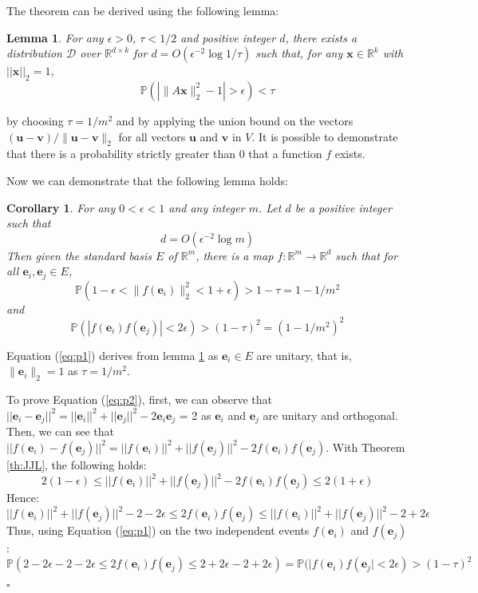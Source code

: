 \documentclass[twoside,11pt]{article}
\newtheorem{lemma}{Lemma}
\newtheorem{corollary}[theorem]{Corollary}
\newenvironment{proof}{{\bf Proof:}}{$\square$ }
\def\vec#1{\mathbf{#1}}
\def\R{\mathbb{R}}
\def\P{\mathbb{P}}
\begin{document}
The theorem can be derived using the following lemma:
\begin{lemma}
\label{th:lemma_1}
For any $\epsilon>0$, $\tau < 1/2$ and positive integer $d$, there exists a distribution $\mathcal D$ over $\R^{d\times k}$ for $d=O(\epsilon^{-2}\log{1/\tau})$ such that, for any $\vec{x} \in \R^k$ with $||\vec{x}||_2=1$,
$$\P(| \|A\vec{x}\|_2^2 -1  | > \epsilon) < \tau$$
\end{lemma}
by choosing $\tau = 1/m^2$ and by applying the union bound on the vectors $(\vec{u} - \vec{v})/\|\vec{u}-\vec{v}\|_2$ for all vectors $\vec{u}$ and $\vec{v}$ in $V$. It is possible to demonstrate that there is a probability strictly greater than $0$ that a function $f$ exists.

Now we can demonstrate that the following lemma holds:
\begin{corollary}
\label{existence_of_f}
For any $0 < \epsilon < 1$ and any integer $m$. Let $d$ be a positive integer such that
$$d=O(\epsilon^{-2}\log{m})$$
Then given the standard basis $E$ of ${\mathbb R}^m$, there is a map $f : {\mathbb R}^m \rightarrow {\mathbb R}^d$ such that for all $\vec{e}_i, \vec{e}_j \in E$, 
\begin{equation}
\P(1 - \epsilon<\|f(\vec{e}_i)\|_2^2 <1 + \epsilon) > 1 - \tau = 1 - 1/m^2
\label{eq:p1}
\end{equation}
and
\begin{equation}
\P(|f(\vec{e}_i)f(\vec{e}_j)|<2\epsilon)> (1 - \tau)^2 = (1 - 1/m^2)^2
\label{eq:p2}
\end{equation}
\end{corollary}

\begin{proof}
Equation (\ref{eq:p1}) derives from lemma \ref{th:lemma_1} as $\vec{e}_i \in E$ are unitary, that is,  $\|\vec{e}_i\|_2=1$ as $\tau = 1/m^2$.

To prove Equation (\ref{eq:p2}), first, we can observe that $||\vec{e}_i-\vec{e}_j||^2 = ||\vec{e}_i||^2 + ||\vec{e}_j||^2 - 2 \vec{e}_i\vec{e}_j$ = 2 as $\vec{e}_i$ and $\vec{e}_j$ are unitary and orthogonal. Then, we can see that $||f(\vec{e}_i)-f(\vec{e}_j)||^2 = ||f(\vec{e}_i)||^2 + ||f(\vec{e}_j)||^2 - 2 f(\vec{e}_i)f(\vec{e}_j)$.
With Theorem \ref{th:JJL}, the following holds:
$$
2(1-\epsilon)\leq||f(\vec{e}_i)||^2 + ||f(\vec{e}_j)||^2 - 2 f(\vec{e}_i)f(\vec{e}_j)\leq2(1+\epsilon)
$$
Hence:
$$
||f(\vec{e}_i)||^2 + ||f(\vec{e}_j)||^2 -2-2\epsilon\leq 2 f(\vec{e}_i)f(\vec{e}_j)\leq||f(\vec{e}_i)||^2 + ||f(\vec{e}_j)||^2  -2+2\epsilon
$$
Thus, using Equation (\ref{eq:p1}) on the two independent events $f(\vec{e}_i)$ and $f(\vec{e}_j)$:  
$$
\P(2 - 2\epsilon -2 -2\epsilon\leq 2 f(\vec{e}_i)f(\vec{e}_j)\leq2+2\epsilon  -2+2\epsilon) = \P(|f(\vec{e}_i)f(\vec{e}_j|<2\epsilon) > (1 - \tau)^2
$$

\end{proof}
\end{document}
